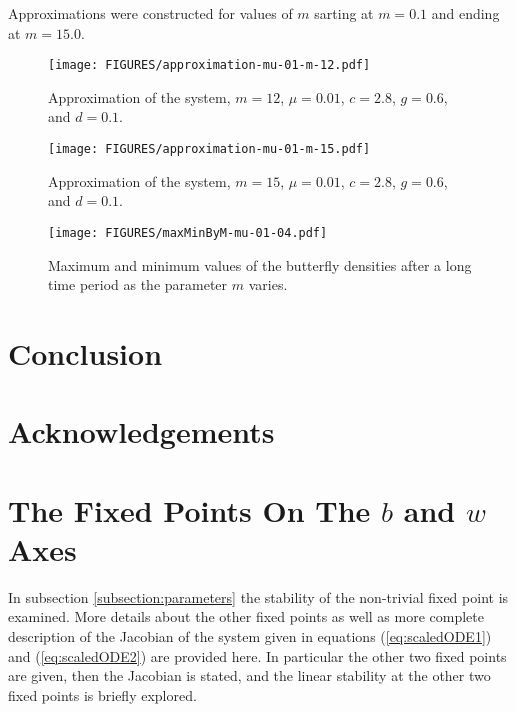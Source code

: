 \documentclass[review]{elsarticle}
\begin{document}
Approximations were constructed for
values of $m$ sarting at $m=0.1$ and ending at $m=15.0$.


\begin{figure}[htb]
  \centering
  \texttt{[image: FIGURES/approximation-mu-01-m-12.pdf]}
  \caption[Approximation with $m=12$ and $\mu=0.01$.]{Approximation of
    the system, $m=12$, $\mu=0.01$, $c=2.8$, $g=0.6$, and $d=0.1$. }
  \label{fig:approximationM12Mu01}
\end{figure}

\begin{figure}[htb]
  \centering
  \texttt{[image: FIGURES/approximation-mu-01-m-15.pdf]}
  \caption[Approximation with $m=15$ and $\mu=0.01$.]{Approximation of
    the system, $m=15$, $\mu=0.01$, $c=2.8$, $g=0.6$, and $d=0.1$. }
  \label{fig:approximationM15Mu01}
\end{figure}

\begin{figure}[htb]
  \centering
  \texttt{[image: FIGURES/maxMinByM-mu-01-04.pdf]}
  \caption[Maximum and minimum values of the butterfly
  density]{Maximum and minimum values of the butterfly densities after
    a long time period as the parameter $m$ varies.}
  \label{fig:maxMinButterflySmallMu}
\end{figure}

\section{Conclusion}

\section{Acknowledgements}

\clearpage

\appendix

\section{The Fixed Points On The $b$ and $w$ Axes}
\label{appendix:otherFixedPoints}

In subsection \ref{subsection:parameters} the stability of the
non-trivial fixed point is examined. More details about the other
fixed points as well as more complete description of the Jacobian of
the system given in equations (\ref{eq:scaledODE1}) and
(\ref{eq:scaledODE2}) are provided here. In particular the other two
fixed points are given, then the Jacobian is stated, and the linear
stability at the other two fixed points is briefly explored.
\end{document}
